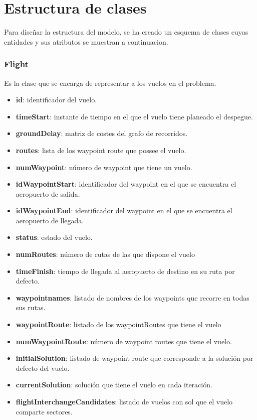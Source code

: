 \chapter{Estructura de clases}
\label{anexo2}
Para diseñar la estructura del modelo, se ha creado un esquema de clases cuyas entidades y sus atributos se muestran a continuacion.
\subsection*{Flight}
Es la clase que se encarga de representar a los vuelos en el problema.
\begin{itemize}
	\item \textbf{id}: identificador del vuelo.
	\item \textbf{timeStart}: instante de tiempo en el que el vuelo tiene planeado el despegue.
	\item \textbf{groundDelay}: matriz de costes del grafo de recorridos.
	\item \textbf{routes}: lista de los waypoint route que possee el vuelo.
	\item \textbf{numWaypoint}: número de waypoint que tiene un vuelo.
	\item \textbf{idWaypointStart}: identificador del waypoint en el que se encuentra el aeropuerto de salida.
	\item \textbf{idWaypointEnd}: identificador del waypoint en el que se encuentra el aeropuerto de llegada.
	\item \textbf{status}: estado del vuelo.
	\item \textbf{numRoutes}: número de rutas de las que dispone el vuelo
	\item \textbf{timeFinish}: tiempo de llegada al aeropuerto de destino en su ruta por defecto.
	\item \textbf{waypointnames}: listado de nombres de los waypoints que recorre en todas sus rutas.
	\item \textbf{waypointRoute}: listado de los waypointRoutes que tiene el vuelo
	\item \textbf{numWaypointRoute}: número de waypoint routes que tiene el vuelo.
	\item \textbf{initialSolution}: listado de waypoint route que corresponde a la solución por defecto del vuelo.
	\item \textbf{currentSolution}: solución que tiene el vuelo en cada iteración.
	\item \textbf{flightInterchangeCandidates}: listado de vuelos con sol que el vuelo comparte sectores.
\end{itemize}

